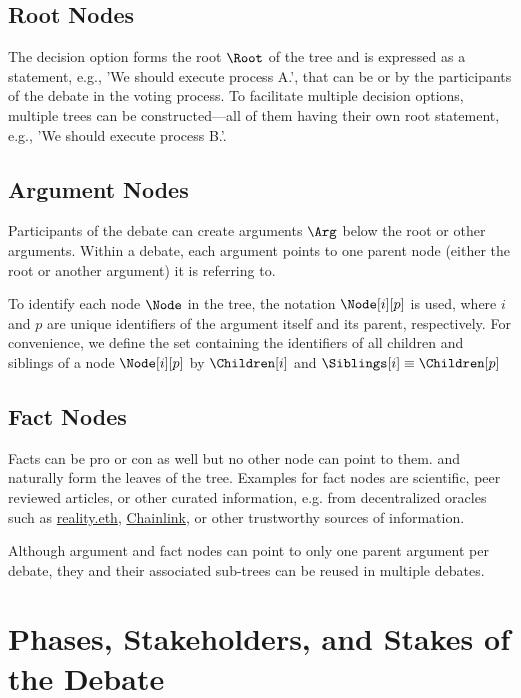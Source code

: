 \documentclass[%
aip,
amsmath,amssymb,
reprint,%
unsortedaddress,
nofootinbib
]{revtex4-2}
\begin{document}
\subsection{Root Nodes}
The decision option forms the root $\Root$ of the tree and is expressed as a statement, 
e.g., 'We should execute process A.', 
that can be  or  by the participants of the debate in the voting process.
%
To facilitate multiple decision options, 
multiple trees can be constructed---all of them having their own root statement, 
e.g., 'We should execute process B.'.

\subsection{Argument Nodes}
Participants of the debate can create arguments $\Arg$ below the root
or other arguments. 
%
Within a debate, each argument points to one parent node (either the root or another argument) it is referring to. 

To identify each node $\Node$ in the tree, the notation $\Node[i][p]$ is used, 
where $i$ and $p$ are unique identifiers of the argument itself and its parent, respectively.
For convenience, we define the set containing the identifiers of all children and siblings of a node $\Node[i][p]$ by $\Children[i]$ and $\Siblings[i]\equiv\Children[p]$


\subsection{Fact Nodes}
Facts can be pro or con as well but no other node can point to them. 
and naturally form the leaves of the tree.
%
Examples for fact nodes are scientific, peer reviewed articles,
or other curated information, e.g. from decentralized oracles such as \href{https://reality.eth.link/}{reality.eth}, \href{https://chain.link/}{Chainlink}, or other trustworthy sources of information.

Although argument and fact nodes can point to only one parent argument per debate,
they and their associated sub-trees can be reused in multiple debates.


\section{Phases, Stakeholders, and Stakes of the Debate}\label{sec:DebatingProcess}
\end{document}
